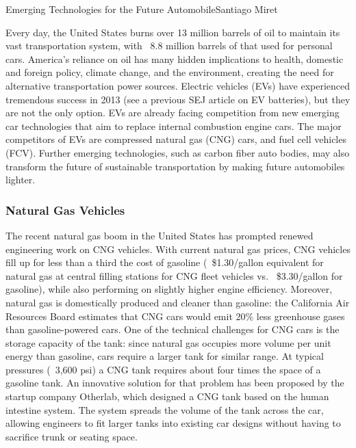 \documentclass{papertex}
\begin{document}
\begin{news}{2}{Emerging Technologies for the Future Automobile}{Santiago Miret}{}{}

Every day, the United States burns over 13 million barrels of oil to maintain
its vast transportation system, with ~8.8 million barrels of that used for
personal cars. America's reliance on oil has many hidden implications to health,
domestic and foreign policy, climate change, and the environment, creating the
need for alternative transportation power sources. Electric vehicles (EVs) have
experienced tremendous success in 2013 (see a previous SEJ article on EV
batteries), but they are not the only option. EVs are already facing competition
from new emerging car technologies that aim to replace internal combustion
engine cars. The major competitors of EVs are compressed natural gas (CNG) cars,
and fuel cell vehicles (FCV). Further emerging technologies, such as carbon
fiber auto bodies, may also transform the future of sustainable transportation
by making future automobiles lighter.

\subsubsection*{Natural Gas Vehicles}

The recent natural gas boom in the United States has prompted renewed
engineering work on CNG vehicles. With current natural gas prices, CNG vehicles
fill up for less than a third the cost of gasoline (~\$1.30/gallon equivalent
for natural gas at central filling stations for CNG fleet vehicles vs.
~\$3.30/gallon for gasoline), while also performing on slightly higher engine
efficiency. Moreover, natural gas is domestically produced and cleaner than
gasoline: the California Air Resources Board estimates that CNG cars would emit
20\% less greenhouse gases than gasoline-powered cars. One of the technical
challenges for CNG cars is the storage capacity of the tank: since natural gas
occupies more volume per unit energy than gasoline, cars require a larger tank
for similar range. At typical pressures (~3,600 psi) a CNG tank requires about
four times the space of a gasoline tank. An innovative solution for that problem
has been proposed by the startup company Otherlab, which designed a CNG tank
based on the human intestine system. The system spreads the volume of the tank
across the car, allowing engineers to fit larger tanks into existing car designs
without having to sacrifice trunk or seating space.


\end{news}
\end{document}
